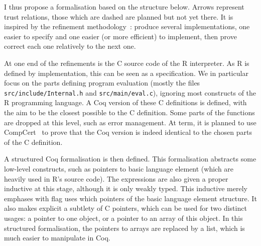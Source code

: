 \documentclass{article}
\newcommand\Coq{Coq}
\newcommand\R{R}
\newcommand\Cn{C}
\begin{document}
I thus propose a formalisation based on the structure below.
Arrows represent trust relations,
those which are dashed are planned but not yet there.
It is inspired by the refinement methodology~\parencite{cohen2013refinements}:
produce several implementations,
one easier to specify and one easier (or more efficient) to implement,
then prove correct each one relatively to the next one.
\begin{center}
\end{center}
At one end of the refinements is the \Cn{} source code of the \R{} interpreter.
As \R{} is defined by implementation,
this can be seen as a specification.
We in particular focus on the parts defining program evaluation
(mostly the files \texttt{src/include/Internal.h} and \texttt{src/main/eval.c}),
ignoring most constructs of the \R{} programming language.
A \Coq{} version of these \Cn{} definitions is defined,
with the aim to be the closest possible to the \Cn{} definition.
Some parts of the functions are dropped at this level,
such as error management.
At term, it is planned to use CompCert~\parencite{Leroy-Compcert-CACM} to prove that the \Coq{}
version is indeed identical to the chosen parts of the \Cn{} definition.

A structured \Coq{} formalisation is then defined.
This formalisation abstracts some low-level constructs,
such as pointers to basic language element
(which are heavily used in \R{}’s source code).
The expressions are also given a proper inductive at this stage,
although it is only weakly typed.
This inductive merely emphases with flag uses which pointers
of the basic language element structure.
It also makes explicit a subtlety of \Cn{} pointers,
which can be used for two distinct usages:
a pointer to one object,
or a pointer to an array of this object.
In this structured formalisation, the pointers to arrays
are replaced by a list,
which is much easier to manipulate in \Coq{}.
\end{document}
